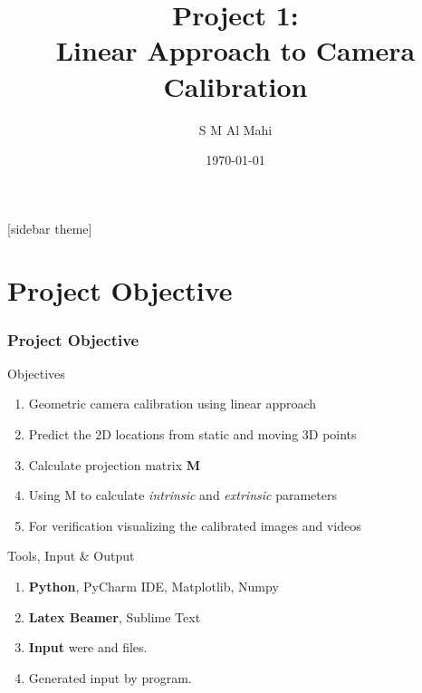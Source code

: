 \documentclass[11pt]{beamer}
\author{S M Al Mahi}
\title[ECEN-5283 Computer Vision]{Project 1: \\Linear Approach to Camera Calibration}
\institute{Oklahoma State University}
\date{\today}
\begin{document}
\begin{frame}
\titlepage
\end{frame}

\newpage
{}[sidebar theme]
\section{Project Objective}
\begin{frame}
\frametitle{Project Objective}
	\begin{block}{Objectives}
	\begin{enumerate}
		\item Geometric camera calibration using linear approach
		\item Predict the 2D locations from static and moving 3D points
		\item Calculate projection matrix \textbf{M}
		\item Using M to calculate \textit{intrinsic} and \textit{extrinsic} parameters
		\item For verification visualizing the calibrated images and videos
	\end{enumerate}
	\end{block}
	\begin{block}{Tools, Input \& Output}
	\begin{enumerate}
		\item \textbf{Python}, PyCharm IDE, Matplotlib, Numpy
		\item \textbf{Latex Beamer}, Sublime Text
		\item \textbf{Input} were  and  files.
		\item Generated input by program.
	\end{enumerate}
	\end{block}
\end{frame}
\end{document}
